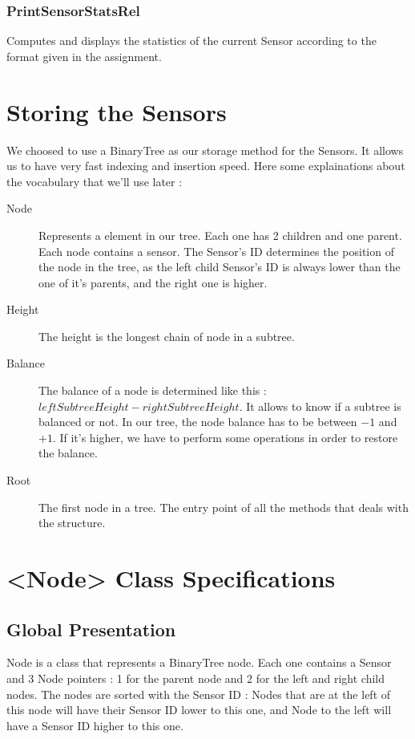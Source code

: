 \documentclass[10pt]{article}
\begin{document}
\subsubsection*{PrintSensorStatsRel}
Computes and displays the statistics of the current Sensor according to the format given in the assignment.

\section{Storing the Sensors}
We choosed to use a BinaryTree as our storage method for the Sensors. It allows us to have very fast indexing and insertion speed.
Here some explainations about the vocabulary that we'll use later :
\begin{description}
	\item[Node] Represents a element in our tree. Each one has 2 children and one parent. Each node contains a sensor. The Sensor's ID determines the position of the node in the tree, as the left child Sensor's ID is always lower than the one of it's parents, and the right one is higher.
	\item[Height] The height is the longest chain of node in a subtree.
	\item[Balance] The balance of a node is determined like this : $ leftSubtreeHeight - rightSubtreeHeight$. It allows to know if a subtree is balanced or not. In our tree, the node balance has to be between $-1$ and $+1$. If it's higher, we have to perform some operations in order to restore the balance.
	\item[Root] The first node in a tree. The entry point of all the methods that deals with the structure.
\end{description}

\section{<Node> Class Specifications}
\subsection{Global Presentation}


Node is a class that represents a BinaryTree node. Each one contains a Sensor and 3 Node pointers : 1 for the parent node and 2 for the left and right child nodes. The nodes are sorted with the Sensor ID : Nodes that are at the left of this node will have their Sensor ID lower to this one, and Node to the left will have a Sensor ID higher to this one.
\end{document}
